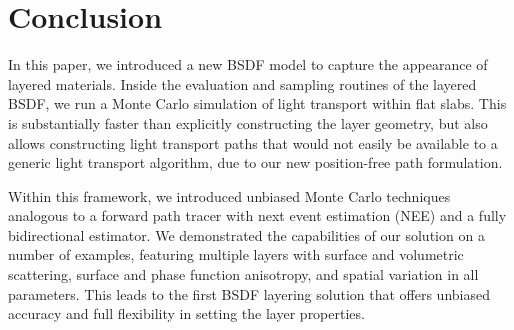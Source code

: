 \section{Conclusion}
\label{sec:layeredbsdf:conclusion}

In this paper, we introduced a new BSDF model to capture the appearance of layered materials. Inside the evaluation and sampling routines of the layered BSDF, we run a Monte Carlo simulation of light transport within flat slabs. This is substantially faster than explicitly constructing the layer geometry, but also allows constructing light transport paths that would not easily be available to a generic light transport algorithm, due to our new position-free path formulation.

Within this framework, we introduced unbiased Monte Carlo techniques analogous to a forward path tracer with next event estimation (NEE) and a fully bidirectional estimator. We demonstrated the capabilities of our solution on a number of examples, featuring multiple layers with surface and volumetric scattering, surface and phase function anisotropy, and spatial variation in all parameters. This leads to the first BSDF layering solution that offers unbiased accuracy and full flexibility in setting the layer properties.

